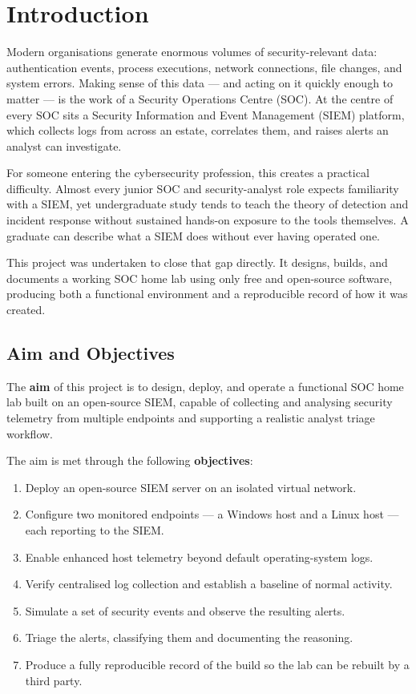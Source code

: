 \section{Introduction}
\label{sec:introduction}

Modern organisations generate enormous volumes of security-relevant data:
authentication events, process executions, network connections, file changes,
and system errors. Making sense of this data --- and acting on it quickly
enough to matter --- is the work of a Security Operations Centre (SOC). At the
centre of every SOC sits a Security Information and Event Management (SIEM)
platform, which collects logs from across an estate, correlates them, and
raises alerts an analyst can investigate.

For someone entering the cybersecurity profession, this creates a practical
difficulty. Almost every junior SOC and security-analyst role expects
familiarity with a SIEM, yet undergraduate study tends to teach the theory of
detection and incident response without sustained hands-on exposure to the
tools themselves. A graduate can describe what a SIEM does without ever having
operated one.

This project was undertaken to close that gap directly. It designs, builds,
and documents a working SOC home lab using only free and open-source software,
producing both a functional environment and a reproducible record of how it
was created.

\subsection{Aim and Objectives}
\label{sec:aim}

The \textbf{aim} of this project is to design, deploy, and operate a functional
SOC home lab built on an open-source SIEM, capable of collecting and analysing
security telemetry from multiple endpoints and supporting a realistic analyst
triage workflow.

The aim is met through the following \textbf{objectives}:

\begin{enumerate}[label=\textbf{O\arabic*.},leftmargin=*]
    \item Deploy an open-source SIEM server on an isolated virtual network.
    \item Configure two monitored endpoints --- a Windows host and a Linux
          host --- each reporting to the SIEM.
    \item Enable enhanced host telemetry beyond default operating-system logs.
    \item Verify centralised log collection and establish a baseline of normal
          activity.
    \item Simulate a set of security events and observe the resulting alerts.
    \item Triage the alerts, classifying them and documenting the reasoning.
    \item Produce a fully reproducible record of the build so the lab can be
          rebuilt by a third party.
\end{enumerate}

